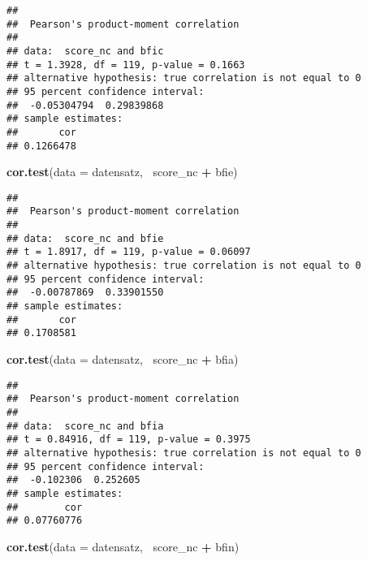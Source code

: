 \documentclass[]{article}
\newenvironment{Shaded}{\begin{snugshade}}{\end{snugshade}}
\newcommand{\KeywordTok}[1]{\textcolor[rgb]{0.13,0.29,0.53}{\textbf{#1}}}
\newcommand{\DataTypeTok}[1]{\textcolor[rgb]{0.13,0.29,0.53}{#1}}
\newcommand{\StringTok}[1]{\textcolor[rgb]{0.31,0.60,0.02}{#1}}
\newcommand{\OperatorTok}[1]{\textcolor[rgb]{0.81,0.36,0.00}{\textbf{#1}}}
\newcommand{\NormalTok}[1]{#1}
\begin{document}
\begin{verbatim}
## 
##  Pearson's product-moment correlation
## 
## data:  score_nc and bfic
## t = 1.3928, df = 119, p-value = 0.1663
## alternative hypothesis: true correlation is not equal to 0
## 95 percent confidence interval:
##  -0.05304794  0.29839868
## sample estimates:
##       cor 
## 0.1266478
\end{verbatim}

\begin{Shaded}
\begin{Highlighting}[]
\KeywordTok{cor.test}\NormalTok{(}\DataTypeTok{data =}\NormalTok{ datensatz, }\OperatorTok{~}\NormalTok{score_nc }\OperatorTok{+}\StringTok{ }\NormalTok{bfie)}
\end{Highlighting}
\end{Shaded}

\begin{verbatim}
## 
##  Pearson's product-moment correlation
## 
## data:  score_nc and bfie
## t = 1.8917, df = 119, p-value = 0.06097
## alternative hypothesis: true correlation is not equal to 0
## 95 percent confidence interval:
##  -0.00787869  0.33901550
## sample estimates:
##       cor 
## 0.1708581
\end{verbatim}

\begin{Shaded}
\begin{Highlighting}[]
\KeywordTok{cor.test}\NormalTok{(}\DataTypeTok{data =}\NormalTok{ datensatz, }\OperatorTok{~}\NormalTok{score_nc }\OperatorTok{+}\StringTok{ }\NormalTok{bfia)}
\end{Highlighting}
\end{Shaded}

\begin{verbatim}
## 
##  Pearson's product-moment correlation
## 
## data:  score_nc and bfia
## t = 0.84916, df = 119, p-value = 0.3975
## alternative hypothesis: true correlation is not equal to 0
## 95 percent confidence interval:
##  -0.102306  0.252605
## sample estimates:
##        cor 
## 0.07760776
\end{verbatim}

\begin{Shaded}
\begin{Highlighting}[]
\KeywordTok{cor.test}\NormalTok{(}\DataTypeTok{data =}\NormalTok{ datensatz, }\OperatorTok{~}\NormalTok{score_nc }\OperatorTok{+}\StringTok{ }\NormalTok{bfin)}
\end{Highlighting}
\end{Shaded}
\end{document}
